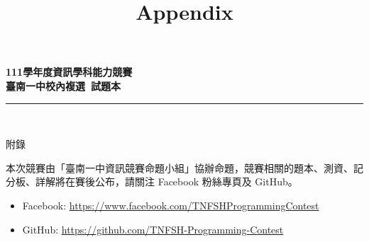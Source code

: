\documentclass[a4paper]{article}
\title{Appendix}
\begin{document}
\begin{center}
\textbf{\huge 111學年度資訊學科能力競賽}\\
\vspace{5mm}
\textbf{\huge 臺南一中校內複選\ 試題本}\\
\vspace{10mm}
\rule{17cm}{2pt}\\
\vspace{5mm}

\huge 附錄\\
\end{center}

\fontsize{14pt}{20pt}\selectfont

\noindent 本次競賽由「臺南一中資訊競賽命題小組」協辦命題，競賽相關的題本、測資、記分板、詳解將在賽後公布，請關注 Facebook 粉絲專頁及 GitHub。
\begin{itemize}
	\item Facebook: \url{https://www.facebook.com/TNFSHProgrammingContest}
	\item GitHub: \url{https://github.com/TNFSH-Programming-Contest}
\end{itemize}
\end{document}
